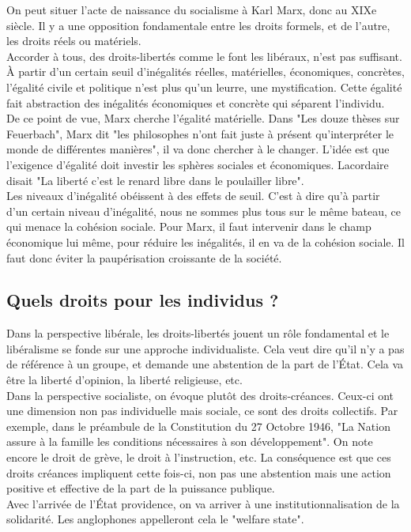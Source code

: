 \documentclass[10pt, a4paper, openany]{book}
\begin{document}
On peut situer l'acte de naissance du socialisme à Karl Marx, donc au XIXe siècle. Il y a une opposition fondamentale entre les droits formels, et de l'autre, les droits réels ou matériels. \\
Accorder à tous, des droits-libertés comme le font les libéraux, n'est pas suffisant. À partir d'un certain seuil d'inégalités réelles, matérielles, économiques, concrètes, l'égalité civile et politique n'est plus qu'un leurre, une mystification. Cette égalité fait abstraction des inégalités économiques et concrète qui séparent l'individu. \\
De ce point de vue, Marx cherche l'égalité matérielle. Dans "Les douze thèses sur Feuerbach", Marx dit "les philosophes n'ont fait juste à présent qu'interpréter le monde de différentes manières", il va donc chercher à le changer. L'idée est que l'exigence d'égalité doit investir les sphères sociales et économiques. Lacordaire disait "La liberté c'est le renard libre dans le poulailler libre". \\
Les niveaux d'inégalité obéissent à des effets de seuil. C'est à dire qu'à partir d'un certain niveau d'inégalité, nous ne sommes plus tous sur le même bateau, ce qui menace la cohésion sociale. Pour Marx, il faut intervenir dans le champ économique lui même, pour réduire les inégalités, il en va de la cohésion sociale. Il faut donc éviter la paupérisation croissante de la société. \\


\subsection{Quels droits pour les individus ?}

Dans la perspective libérale, les droits-libertés jouent un rôle fondamental et le libéralisme se fonde sur une approche individualiste. Cela veut dire qu'il n'y a pas de référence à un groupe, et demande une abstention de la part de l'État. Cela va être la liberté d'opinion, la liberté religieuse, etc. \\
Dans la perspective socialiste, on évoque plutôt des droits-créances. Ceux-ci ont une dimension non pas individuelle mais sociale, ce sont des droits collectifs. Par exemple, dans le préambule de la Constitution du 27 Octobre 1946, "La Nation assure à la famille les conditions nécessaires à son développement". On note encore le droit de grève, le droit à l'instruction, etc. La conséquence est que ces droits créances impliquent cette fois-ci, non pas une abstention mais une action positive et effective de la part de la puissance publique. \\
Avec l'arrivée de l'État providence, on va arriver à une institutionnalisation de la solidarité. Les anglophones appelleront cela le "welfare state".
\end{document}
